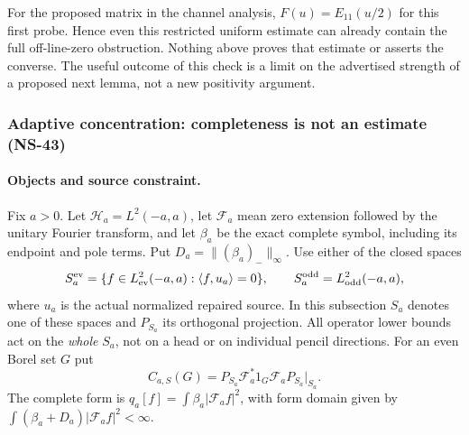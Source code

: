 \documentclass[11pt]{article}
\theoremstyle{remark}
\begin{document}
For the proposed matrix in the channel analysis, $F(u)=E_{11}(u/2)$
for this first probe. Hence even this restricted uniform estimate can
already contain the full off-line-zero obstruction. Nothing above
proves that estimate or asserts the converse. The useful outcome of
this check is a limit on the advertised strength of a proposed next
lemma, not a new positivity argument.


\subsubsection*{Adaptive concentration: completeness is not an estimate (NS-43)}
\label{ns43-conc-sec}

\paragraph{Objects and source constraint.}
Fix $a>0$. Let $\mathcal H_a=L^2(-a,a)$, let $\mathcal F_a$ mean
zero extension followed by the unitary Fourier transform, and let
$\beta_a$ be the exact complete symbol, including its endpoint and pole
terms. Put $D_a=\| (\beta_a)_-\|_\infty$.
Use either of the closed spaces
\[
 S_a^{\rm ev}=\{f\in L^2_{\rm ev}(-a,a):\langle f,u_a\rangle=0\},
 \qquad S_a^{\rm odd}=L^2_{\rm odd}(-a,a),
\]
where $u_a$ is the actual normalized repaired source.
In this subsection $S_a$ denotes one of these spaces and $P_{S_a}$
its orthogonal projection. All operator lower bounds act on the
\emph{whole} $S_a$, not on a head or on individual pencil directions.
For an even Borel set $G$ put
\[
 C_{a,S}(G)=P_{S_a}\mathcal F_a^*1_G\mathcal F_aP_{S_a}|_{S_a}.
\]
The complete form is
$q_a[f]=\int\beta_a|\mathcal F_af|^2$, with form domain given by
$\int(\beta_a+D_a)|\mathcal F_af|^2<\infty$.
\end{document}
